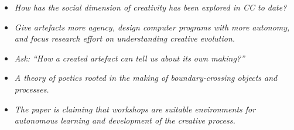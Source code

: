 \documentclass[letterpaper]{article}
\begin{document}
\begin{dialogue}

\begin{mdframed}
\begin{itemize}
\item \emph{How has the social dimension of creativity has been
  explored in CC to date?}
\item \emph{Give artefacts more agency, design computer programs with
  more autonomy, and focus research effort on understanding creative
  evolution.}
\item \emph{Ask: ``How a created artefact can tell us about its own
  making?''}
\item \emph{A theory of poetics rooted in the making of
  boundary-crossing objects and processes.}
\item \emph{The paper is claiming that workshops are suitable
  environments for autonomous learning and development of the creative
  process.}
\end{itemize}
\end{mdframed}


\end{dialogue}
\end{document}
